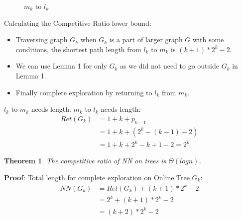 \documentclass{report}
\newtheorem{theorem}{Theorem}[section]
\begin{document}
\begin{figure}[h]

    \caption{$m_k$ to $l_k$}
    \label{fig:my_label}
\end{figure}





{
Calculating the Competitive Ratio lower bound: 
%
% 
{
% 
%
\begin{itemize}
        \item {
            Traversing graph {$G_k$} when {$G_k$} is a part of larger graph {$G$} with some conditions, the shortest path length from {$l_k$} to {$m_k$} is {$(k+1)*2^k-2$}.
        }
        \item {
            We can use Lemma 1 for only {$G_k$} as we did not need to go outside {$G_k$} in Lemma 1.
        }
        \item {
            Finally complete exploration by returning to {$l_k$} from {$m_k$}.
        }
    \end{itemize}
% 
} 
% 
%
{
% 

% 
    
        {
            {$l_k$} to {$m_k$} needs length:       
        }
        {
            {$m_k$} to {$l_k$} needs length: 
            \begin{align*}
                Ret(G_k)    &= 1 + k + p_{k-1} \\
                            &= 1 + k + (2^k - (k-1) - 2) \\
                            &= 1 + k + 2^k - k + 1 - 2 = 2^k 
            \end{align*}
        }
    
% 
} 
% 
% 

}

\begin{theorem}
The competitive ratio of NN on trees is $\Theta(logn)$.
\end{theorem}
\textbf{Proof}: Total length for complete exploration on Online Tree {$G_k$}:
\begin{align*}
                NN(G_k) &= Ret(G_k) + (k+1)*2^k - 2 \\
                        &= 2^k + (k+1)*2^k - 2 \\
                        &= (k+2)*2^k - 2 \\
\end{align*}
\end{document}
